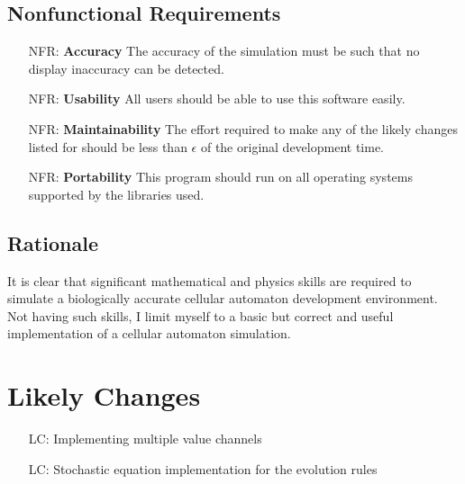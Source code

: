 \documentclass[12pt]{article}
\newcounter{nfrnum} %
\newcounter{lcnum} %
\begin{document}
\subsection{Nonfunctional Requirements}

\noindent \begin{itemize}

\item[NFR\refstepcounter{nfrnum}\thenfrnum \label{NFR_Accuracy}:]
  \textbf{Accuracy} The accuracy of the simulation must be such that no display inaccuracy can be detected.

\item[NFR\refstepcounter{nfrnum}\thenfrnum \label{NFR_Usability}:] \textbf{Usability} All users should be able to use this software easily.

\item[NFR\refstepcounter{nfrnum}\thenfrnum \label{NFR_Maintainability}:]
  \textbf{Maintainability} The effort required to make any of the likely
    changes listed for \progname{} should be less than $\epsilon$ of the original
    development time.

\item[NFR\refstepcounter{nfrnum}\thenfrnum \label{NFR_Portability}:]
  \textbf{Portability} This program should run on all operating systems supported by the libraries used.

\end{itemize}

\subsection{Rationale}

It is clear that significant mathematical and physics skills are required to simulate a biologically accurate cellular automaton development environment. 
Not having such skills, I limit myself to a basic but correct and useful implementation of a cellular automaton simulation.

\section{Likely Changes}    

\noindent \begin{itemize}

\item[LC\refstepcounter{lcnum}\thelcnum\label{LC_meaningfulLabel}:] Implementing multiple value channels

\item[LC\refstepcounter{lcnum}\thelcnum\label{LC_meaningfulLabel}:] Stochastic equation implementation for the evolution rules
\end{itemize}
\end{document}
